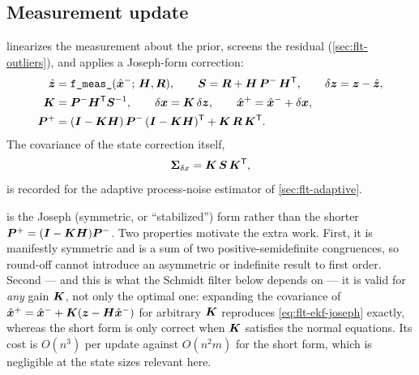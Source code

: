 \subsection{Measurement update}

 linearizes the measurement about the prior, screens the
residual (\cref{sec:flt-outliers}), and applies a Joseph-form correction:
\begin{align}
  \label{eq:flt-ekf-innov}
  \hat{\bm{z}} &= \texttt{f\_meas\_}(\hat{\bm{x}}^{-};\, \bm{H}, \bm{R}),
  \qquad
  \bm{S} = \bm{R} + \bm{H}\,\bm{P}^{-}\,\bm{H}^{\mathsf{T}},
  \qquad
  \delta \bm{z} = \bm{z} - \hat{\bm{z}}, \\
  \label{eq:flt-ekf-gain}
  \bm{K} &= \bm{P}^{-}\bm{H}^{\mathsf{T}} \bm{S}^{-1},
  \qquad
  \delta \bm{x} = \bm{K}\,\delta \bm{z},
  \qquad
  \hat{\bm{x}}^{+} = \hat{\bm{x}}^{-} + \delta \bm{x}, \\
  \label{eq:flt-ekf-joseph}
  \bm{P}^{+} &= (\bm{I} - \bm{K}\bm{H})\,\bm{P}^{-}\,
                (\bm{I} - \bm{K}\bm{H})^{\mathsf{T}}
              + \bm{K}\,\bm{R}\,\bm{K}^{\mathsf{T}} .
\end{align}
The covariance of the state correction itself,
\begin{equation}
  \label{eq:flt-ekf-sigmadx}
  \bm{\Sigma}_{\delta x} = \bm{K}\,\bm{S}\,\bm{K}^{\mathsf{T}} ,
\end{equation}
is recorded for the adaptive process-noise estimator of
\cref{sec:flt-adaptive}.

 is the Joseph (symmetric, or ``stabilized'') form
rather than the shorter $\bm{P}^{+} = (\bm{I} - \bm{K}\bm{H})\bm{P}^{-}$.
Two properties motivate the extra work. First, it is manifestly symmetric and
is a sum of two positive-semidefinite congruences, so round-off cannot
introduce an asymmetric or indefinite result to first order. Second --- and
this is what the Schmidt filter below depends on --- it is valid for
\emph{any} gain $\bm{K}$, not only the optimal one: expanding the covariance
of $\hat{\bm{x}}^{+} = \hat{\bm{x}}^{-} + \bm{K}(\bm{z} - \bm{H}
\hat{\bm{x}}^{-})$ for arbitrary $\bm{K}$ reproduces
\cref{eq:flt-ekf-joseph} exactly, whereas the short form is only correct when
$\bm{K}$ satisfies the normal equations. Its cost is $O(n^3)$ per update
against $O(n^2 m)$ for the short form, which is negligible at the state sizes
relevant here.

